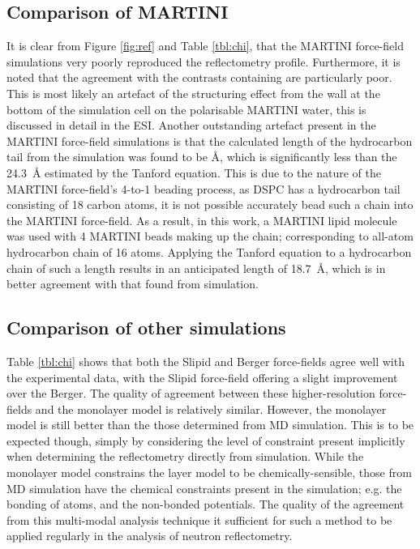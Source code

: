 \documentclass[amsmath,amssymb,twocolumn,superscriptaddress,aps,prl]{revtex4-1}
\begin{document}
\subsection{Comparison of MARTINI}
It is clear from Figure \ref{fig:ref} and Table \ref{tbl:chi}, that the MARTINI force-field simulations very poorly reproduced the reflectometry profile.
Furthermore, it is noted that the agreement with the contrasts containing  are particularly poor.
This is most likely an artefact of the structuring effect from the wall at the bottom of the simulation cell on the polarisable MARTINI water, this is discussed in detail in the ESI.
Another outstanding artefact present in the MARTINI force-field simulations is that the calculated length of the hydrocarbon tail from the simulation was found to be \si{\angstrom}, which is significantly less than the \SI{24.3}{\angstrom} estimated by the Tanford equation.
This is due to the nature of the MARTINI force-field's 4-to-1 beading process, as DSPC has a hydrocarbon tail consisting of 18 carbon atoms, it is not possible accurately bead such a chain into the MARTINI force-field.
As a result, in this work, a MARTINI lipid molecule was used with 4 MARTINI beads making up the chain; corresponding to all-atom hydrocarbon chain of 16 atoms.
Applying the Tanford equation to a hydrocarbon chain of such a length results in an anticipated length of \SI{18.7}{\angstrom}, which is in better agreement with that found from simulation.

\subsection{Comparison of other simulations}
Table \ref{tbl:chi} shows that both the Slipid and Berger force-fields agree well with the experimental data, with the Slipid force-field offering a slight improvement over the Berger.
The quality of agreement between these higher-resolution force-fields and the monolayer model is relatively similar.
However, the monolayer model is still better than the those determined from MD simulation.
This is to be expected though, simply by considering the level of constraint present implicitly when determining the reflectometry directly from simulation.
While the monolayer model constrains the layer model to be chemically-sensible, those from MD simulation have the chemical constraints present in the simulation; e.g. the bonding of atoms, and the non-bonded potentials.
The quality of the agreement from this multi-modal analysis technique it sufficient for such a method to be applied regularly in the analysis of neutron reflectometry.
\end{document}
